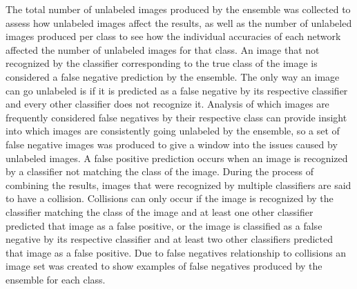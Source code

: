 \documentclass[10pt,twocolumn,letterpaper]{article}
\begin{document}
The total number of unlabeled images produced by the ensemble was collected to assess how unlabeled images affect the results, as well as the number of unlabeled images produced per class to see how the individual accuracies of each network affected the number of unlabeled images for that class. An image that not recognized by the classifier corresponding to the true class of the image is considered a false negative prediction by the ensemble. The only way an image can go unlabeled is if it is predicted as a false negative by its respective classifier and every other classifier does not recognize it. Analysis of which images are frequently considered false negatives by their respective class can provide insight into which images are consistently going unlabeled by the ensemble, so a set of false negative images was produced to give a window into the issues caused by unlabeled images. A false positive prediction occurs when an image is recognized by a classifier not matching the class of the image. During the process of combining the results, images that were recognized by multiple classifiers are said to have a collision.  Collisions can only occur if the image is recognized by the classifier matching the class of the image and at least one other classifier predicted that image as a false positive, or the image is classified as a false negative by its respective classifier and at least two other classifiers predicted that image as a false positive. Due to false negatives relationship to collisions an image set was created to show examples of false negatives produced by the ensemble for each class.
\end{document}
